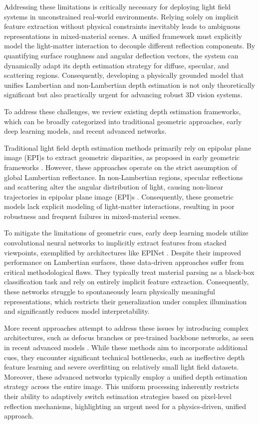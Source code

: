 Addressing these limitations is critically necessary for deploying light field systems in unconstrained real-world environments. Relying solely on implicit feature extraction without physical constraints inevitably leads to ambiguous representations in mixed-material scenes. A unified framework must explicitly model the light-matter interaction to decouple different reflection components. By quantifying surface roughness and angular deflection vectors, the system can dynamically adapt its depth estimation strategy for diffuse, specular, and scattering regions. Consequently, developing a physically grounded model that unifies Lambertian and non-Lambertian depth estimation is not only theoretically significant but also practically urgent for advancing robust 3D vision systems.

To address these challenges, we review existing depth estimation frameworks, which can be broadly categorized into traditional geometric approaches, early deep learning models, and recent advanced networks.

Traditional light field depth estimation methods primarily rely on epipolar plane image (EPI)s to extract geometric disparities, as proposed in early geometric frameworks . However, these approaches operate on the strict assumption of global Lambertian reflectance. In non-Lambertian regions, specular reflections and scattering alter the angular distribution of light, causing non-linear trajectories in epipolar plane image (EPI)s . Consequently, these geometric models lack explicit modeling of light-matter interactions, resulting in poor robustness and frequent failures in mixed-material scenes.

To mitigate the limitations of geometric cues, early deep learning models utilize convolutional neural networks to implicitly extract features from stacked viewpoints, exemplified by architectures like EPINet . Despite their improved performance on Lambertian surfaces, these data-driven approaches suffer from critical methodological flaws. They typically treat material parsing as a black-box classification task and rely on entirely implicit feature extraction. Consequently, these networks struggle to spontaneously learn physically meaningful representations, which restricts their generalization under complex illumination and significantly reduces model interpretability.

More recent approaches attempt to address these issues by introducing complex architectures, such as defocus branches or pre-trained backbone networks, as seen in recent advanced models . While these methods aim to incorporate additional cues, they encounter significant technical bottlenecks, such as ineffective depth feature learning and severe overfitting on relatively small light field datasets. Moreover, these advanced networks typically employ a unified depth estimation strategy across the entire image. This uniform processing inherently restricts their ability to adaptively switch estimation strategies based on pixel-level reflection mechanisms, highlighting an urgent need for a physics-driven, unified approach.


